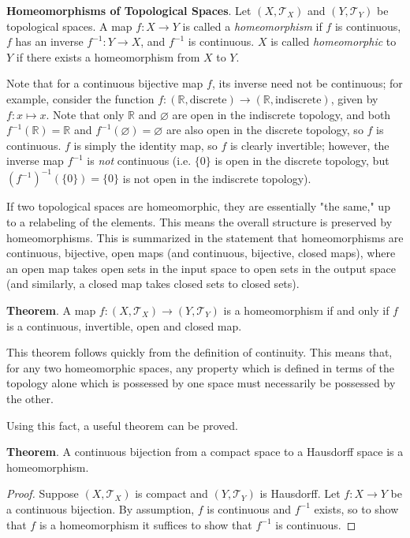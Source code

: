 \begin{framed}
    \textbf{Homeomorphisms of Topological Spaces}. Let $(X,\mathcal{T}_X)$ and $(Y,\mathcal{T}_Y)$ be topological spaces. A map $f:X\to Y$ is called a \textit{homeomorphism} if $f$ is continuous, $f$ has an inverse $f^{-1}:Y\to X$, and $f^{-1}$ is continuous. $X$ is called \textit{homeomorphic} to $Y$ if there exists a homeomorphism from $X$ to $Y$.

    Note that for a continuous bijective map $f$, its inverse need not be continuous; for example, consider the function $f:(\mathbb{R},\text{discrete})\to (\mathbb{R},\text{indiscrete})$, given by $f:x\mapsto x$. Note that only $\mathbb{R}$ and $\varnothing$ are open in the indiscrete topology, and both $f^{-1}(\mathbb{R})=\mathbb{R}$ and $f^{-1}(\varnothing)=\varnothing$ are also open in the discrete topology, so $f$ is continuous. $f$ is simply the identity map, so $f$ is clearly invertible; however, the inverse map $f^{-1}$ is \textit{not} continuous (i.e. $\{0\}$ is open in the discrete topology, but $(f^{-1})^{-1}(\{0\}) = \{0\}$ is not open in the indiscrete topology).

    If two topological spaces are homeomorphic, they are essentially "the same," up to a relabeling of the elements. This means the overall structure is preserved by homeomorphisms. This is summarized in the statement that homeomorphisms are continuous, bijective, open maps (and continuous, bijective, closed maps), where an open map takes open sets in the input space to open sets in the output space (and similarly, a closed map takes closed sets to closed sets). 

    \textbf{Theorem}. A map $f:(X,\mathcal{T}_X)\to (Y,\mathcal{T}_Y)$ is a homeomorphism if and only if $f$ is a continuous, invertible, open and closed map.

    This theorem follows quickly from the definition of continuity. This means that, for any two homeomorphic spaces, any property which is defined in terms of the topology alone which is possessed by one space must necessarily be possessed by the other.

    Using this fact, a useful theorem can be proved.
    
    \textbf{Theorem}. A continuous bijection from a compact space to a Hausdorff space is a homeomorphism. \vspace{-1em}\begin{proof}
        Suppose $(X,\mathcal{T}_X)$ is compact and $(Y,\mathcal{T}_Y)$ is Hausdorff. Let $f:X\to Y$ be a continuous bijection. By assumption, $f$ is continuous and $f^{-1}$ exists, so to show that $f$ is a homeomorphism it suffices to show that $f^{-1}$ is continuous.


\end{proof}
\end{framed}
